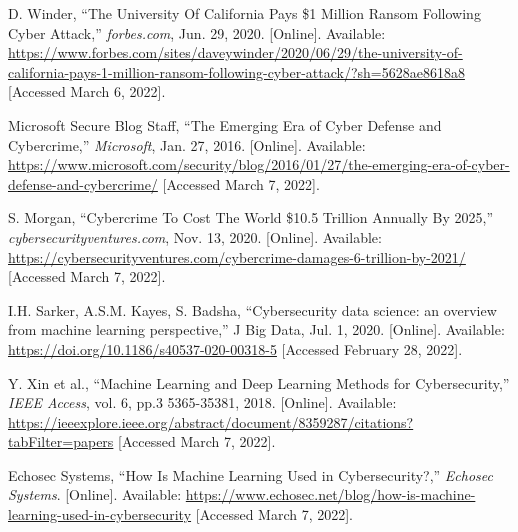 \begin{thebibliography}{99}
    D. Winder, ``The University Of California Pays \$1 Million Ransom Following Cyber Attack,''
    \textit{forbes.com}, Jun. 29, 2020. [Online].
    Available: \href{https://www.forbes.com/sites/daveywinder/2020/06/29/the-university-of-california-pays-1-million-ransom-following-cyber-attack/?sh=5628ae8618a8}{https://www.forbes.com/sites/daveywinder/2020/06/29/the-university-of-california-pays-1-million-ransom-following-cyber-attack/?sh=5628ae8618a8}
    [Accessed March 6, 2022].

    Microsoft Secure Blog Staff, ``The Emerging Era of Cyber Defense and Cybercrime,''
    \textit{Microsoft}, Jan. 27, 2016. [Online].
    Available: \href{https://www.microsoft.com/security/blog/2016/01/27/the-emerging-era-of-cyber-defense-and-cybercrime/}{https://www.microsoft.com/security/blog/2016/01/27/the-emerging-era-of-cyber-defense-and-cybercrime/}
    [Accessed March 7, 2022].

    S. Morgan, ``Cybercrime To Cost The World \$10.5 Trillion Annually By 2025,''
    \textit{cybersecurityventures.com}, Nov. 13, 2020. [Online].
    Available: \href{https://cybersecurityventures.com/cybercrime-damages-6-trillion-by-2021/}{https://cybersecurityventures.com/cybercrime-damages-6-trillion-by-2021/}
    [Accessed March 7, 2022].

    I.H. Sarker, A.S.M. Kayes, S. Badsha, ``Cybersecurity data science: an overview from machine learning perspective,''
    J Big Data, Jul. 1, 2020. [Online].
    Available: \href{https://doi.org/10.1186/s40537-020-00318-5}{https://doi.org/10.1186/s40537-020-00318-5}
    [Accessed February 28, 2022].

    Y. Xin et al., ``Machine Learning and Deep Learning Methods for Cybersecurity,''
    \textit{IEEE Access}, vol. 6, pp.3 5365-35381, 2018. [Online].
    Available: \href{https://ieeexplore.ieee.org/abstract/document/8359287/citations?tabFilter=papers}{https://ieeexplore.ieee.org/abstract/document/8359287/citations?tabFilter=papers}
    [Accessed March 7, 2022].

    Echosec Systems, ``How Is Machine Learning Used in Cybersecurity?,''
    \textit{Echosec Systems}. [Online].
    Available: \href{https://www.echosec.net/blog/how-is-machine-learning-used-in-cybersecurity}{https://www.echosec.net/blog/how-is-machine-learning-used-in-cybersecurity}
    [Accessed March 7, 2022].


\end{thebibliography}
